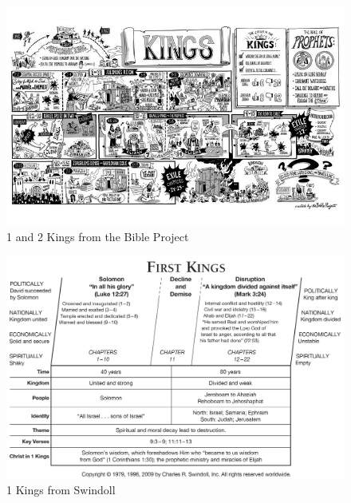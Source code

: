 \newpage
\begin{figure}
\begin{center}
\includegraphics[scale=4, angle=90]{11OT-1Kings/References/BibleProject-1and2Kings}
\caption[1 and 2 Kings from the Bible Project]{1 and 2 Kings from the Bible Project}
\label{fig:1 and 2 Kings from the Bible Project}
\end{center}
\end{figure}

\newpage
\begin{figure}
\begin{center}
\includegraphics[scale=0.25, angle=90]{11OT-1Kings/References/Swindoll-1Kings}
\caption[1 Kings from Swindoll]{1 Kings from Swindoll}
\label{fig:1 Kings from Swindoll}
\end{center}
\end{figure}

